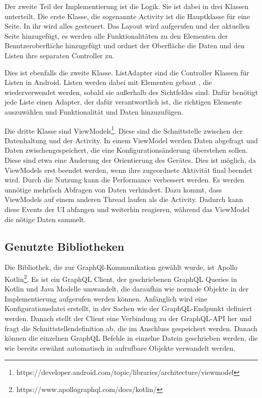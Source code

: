 Der zweite Teil der Implementierung ist die Logik. Sie ist dabei in drei Klassen unterteilt. 
Die erste Klasse, die sogenannte Activity ist die Hauptklasse für eine Seite. In ihr wird alles gesteuert. Das Layout wird aufgerufen und der aktuellen Seite hinzugefügt, es werden alle Funktionalitäten zu den Elementen der Benutzeroberfläche hinzugefügt und ordnet der Oberfläche die Daten und den Listen ihre separaten Controller zu.

Dies ist ebenfalls die zweite Klasse. ListAdapter sind die Controller Klassen für Listen in Android. Listen werden dabei mit Elementen gebaut , die wiederverwendet werden, sobald sie außerhalb des Sichtfeldes sind. Dafür benötigt jede Liste einen Adapter, der dafür verantwortlich ist, die richtigen Elemente auszuwählen und Funktionalität und Daten hinzuzufügen.

Die dritte Klasse sind ViewModels\footnote{https://developer.android.com/topic/libraries/architecture/viewmodel}. Diese sind die Schnittstelle zwischen der Datenhaltung und der Activity. In einem ViewModel werden Daten abgefragt und Daten zwischengespeichert, die eine Konfigurationsänderung überstehen sollen. Diese sind etwa eine Änderung der Orientierung des Gerätes. Dies ist möglich, da ViewModels erst beendet werden, wenn ihre zugeordnete Aktivität final beendet wird. 
Durch die Nutzung kann die Performance verbessert werden. Es werden unnötige mehrfach Abfragen von Daten verhindert. Dazu kommt, dass ViewModels auf einem anderen Thread laufen als die Activity. Dadurch kann diese Events der \ac{UI} abfangen und weiterhin reagieren, während das ViewModel die nötige Daten sammelt.


\subsection{Genutzte Bibliotheken}
Die Bibliothek, die zur GraphQl-Kommunikation gewählt wurde, ist Apollo Kotlin\footnote{https://www.apollographql.com/docs/kotlin/}. 
Es ist ein GraphQL Client, der geschriebenen GraphQL Queries in Kotlin und Java Modelle umwandelt, die daraufhin wie normale Objekte in der Implementierung aufgerufen werden können. 
Anfänglich wird eine Konfigurationsdatei erstellt, in der Sachen wie der GraphQL-Endpunkt definiert werden. 
Danach stellt der Client eine Verbindung zu der GraphQL-\ac{API} her und fragt die Schnittstellendefinition ab, die im Anschluss gespeichert werden. 
Danach können die einzelnen GraphQL Befehle in einzelne Datein geschrieben werden, die wie bereits erwähnt automatisch in aufrufbare Objekte verwandelt werden.

